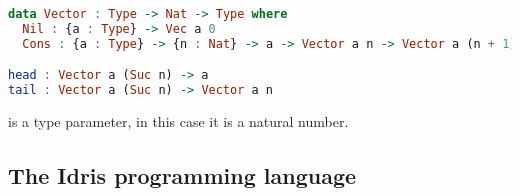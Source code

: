 \documentclass[parskip=half]{scrartcl}
\begin{document}



\begin{lstlisting}[language=Haskell]
data Vector : Type -> Nat -> Type where
  Nil : {a : Type} -> Vec a 0
  Cons : {a : Type} -> {n : Nat} -> a -> Vector a n -> Vector a (n + 1)

head : Vector a (Suc n) -> a
tail : Vector a (Suc n) -> Vector a n
\end{lstlisting}
\caption \textit{n} is a type parameter, in this case it is a natural number.





\subsection{The Idris programming language}


\end{document}
